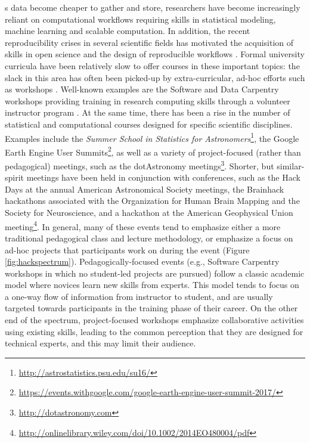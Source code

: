 \label{sec:introduction}
s data become cheaper to gather and store, researchers have become increasingly reliant on computational workflows requiring skills in statistical modeling, machine learning and scalable computation. In addition, the recent reproducibility crises in several scientific fields has motivated the acquisition of skills in open science and the design of reproducible workflows \cite[e.g.][]{pashler2012,baker2016}.
Formal university curricula have been relatively slow to offer courses in these important topics: the slack in this area has often been picked-up by extra-curricular, ad-hoc efforts such as workshops \cite{demasi2017}.
Well-known examples are the Software and Data Carpentry workshops providing training in research computing skills through a volunteer instructor program \cite{b:wilson-swc-lessons-2016,teal2015data}.
At the same time, there has been a rise in the number of statistical and computational courses designed for specific scientific disciplines.
Examples include the \textit{Summer School in Statistics for Astronomers}\footnote{\url{http://astrostatistics.psu.edu/su16/}}, the Google Earth Engine User Summits\footnote{\url{https://events.withgoogle.com/google-earth-engine-user-summit-2017/}}, as well as a variety of project-focused (rather than pedagogical) meetings, such as the dotAstronomy meetings\footnote{\url{http://dotastronomy.com}}.
Shorter, but similar-spirit meetings have been held in conjunction with conferences, such as the Hack Days at the annual American Astronomical Society meetings, the Brainhack hackathons associated with the Organization for Human Brain Mapping and the Society for Neuroscience\cite{Cameron_Craddock2016-wc}, and a hackathon at the American Geophysical Union meeting\footnote{\url{http://onlinelibrary.wiley.com/doi/10.1002/2014EO480004/pdf}}. 
In general, many of these events tend to emphasize either a more traditional pedagogical class and lecture methodology, or emphasize a focus on ad-hoc projects that participants work on during the event (Figure \ref{fig:hackspectrum}).
Pedagogically-focused events (e.g., Software Carpentry workshops \cite{b:wilson-swc-lessons-2016} in which no student-led projects are pursued) follow a classic academic model where novices learn new skills from experts. This model tends to focus on a one-way flow of information from instructor to student, and are usually targeted towards participants in the training phase of their career. On the other end of the spectrum, project-focused workshops emphasize collaborative activities using existing skills, leading to the common perception that they are designed for technical experts, and this may limit their audience.
